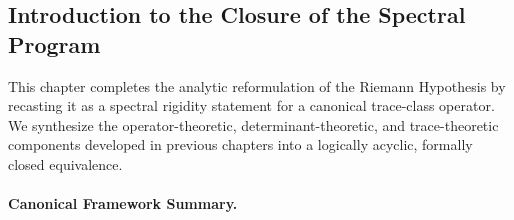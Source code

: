 \subsection*{Introduction to the Closure of the Spectral Program}
\label{subsec:closure_of_spectral_program}

This chapter completes the analytic reformulation of the Riemann Hypothesis by recasting it as a spectral rigidity statement for a canonical trace-class operator. We synthesize the operator-theoretic, determinant-theoretic, and trace-theoretic components developed in previous chapters into a logically acyclic, formally closed equivalence.

\paragraph{Canonical Framework Summary.}

